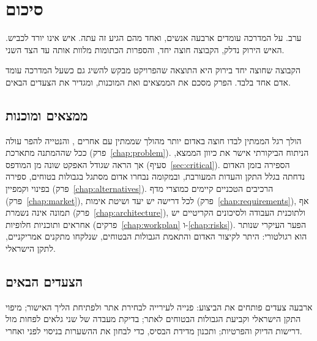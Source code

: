 \chapter{סיכום}
\begin{scenebox}
ערב. על המדרכה עומדים ארבעה אנשים, ואחד מהם הגיע זה עתה. איש אינו יורד לכביש.
האיש הירוק נדלק, הקבוצה חוצה יחד, והספרות הכתומות מלוות אותה עד הצד השני.
\end{scenebox}

הקבוצה שחוצה יחד בירוק היא התוצאה שהפרויקט מבקש להשיג גם כשעל המדרכה עומד אדם אחד בלבד. הפרק מסכם את הממצאים ואת המוכנות, ומגדיר את הצעדים הבאים.

\section{ממצאים ומוכנות}
הולך רגל הממתין לבדו חוצה באדום יותר מהולך שממתין עם אחרים \cite{rosenbloom2009}, והנטייה להפר עולה ככל שההמתנה מתארכת (פרק~\ref{chap:problem}). הניתוח הביקורתי אישר את כיוון הממצא, אך הראה שגודל האפקט שונה מן המודפס (סעיף~\ref{sec:critical}).
הספירה בזמן האדום נדחתה בגלל התקן והעדות המעורבת, ובמקומה נבחרו אדום מסתגל בגבולות בטוחים, ספירה בפינוי וקמפיין (פרק~\ref{chap:alternatives}).
הרכיבים הטכניים קיימים כמוצרי מדף (פרק~\ref{chap:market}), לכל דרישה יש יעד ושיטת אימות (פרק~\ref{chap:requirements}), אף תמונה אינה נשמרת (פרק~\ref{chap:architecture}), ולתוכנית העבודה ולסיכונים הקריטיים יש אחראים ותוכניות חלופיות (פרקים~\ref{chap:workplan} ו-\ref{chap:risks}).
הפער העיקרי שנותר הוא רגולטורי: היתר לקיצור האדום והתאמת הגבולות הבטוחים, שנלקחו מתקנים אמריקניים, לתקן הישראלי.

\section{הצעדים הבאים}
ארבעה צעדים פותחים את הביצוע: פנייה לעירייה לבחירת אתר ולפתיחת הליך האישור; מיפוי התקן הישראלי וקביעת הגבולות הבטוחים לאתר; בדיקת מעבדה של שני גלאים לפחות מול דרישות הדיוק והפרטיות; ותכנון מדידת הבסיס, כדי לבחון את ההשערות בניסוי לפני ואחרי.
